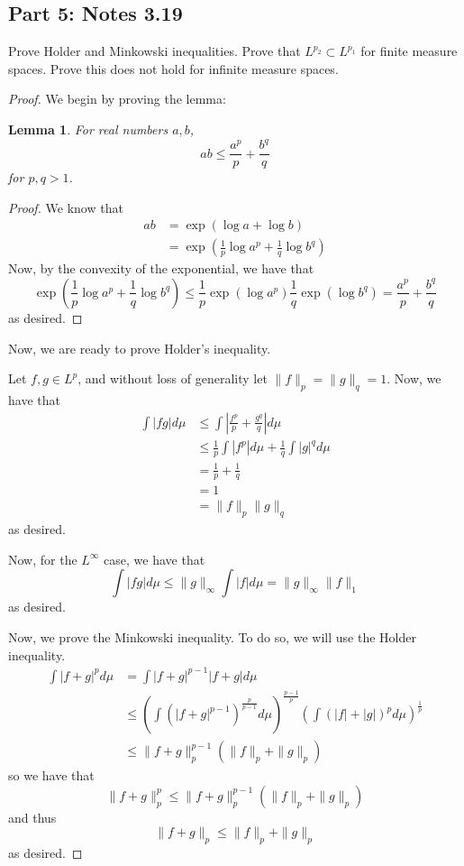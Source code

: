 \documentclass[fontsize=11pt]{scrartcl} %
\numberwithin{equation}{section} %
\numberwithin{figure}{section} %
\numberwithin{table}{section} %
\newtheorem{lemma}{Lemma}
\begin{document}
\subsection*{Part 5: Notes 3.19}
Prove Holder and Minkowski inequalities. Prove that $L^{p_2}\subset L^{p_1}$ for
finite measure spaces. Prove this does not hold for infinite measure spaces.
\\
\begin{proof}
We begin by proving the lemma:
\begin{lemma}
For real numbers $a,b$,
    \[
        ab \leq \frac{a^p}{p} + \frac{b^{q}}{q}
    \]
    for $p,q > 1$.
\end{lemma}
    \begin{proof}
    We know that
        \[
            \begin{aligned}
                ab &= \exp(\log a + \log b)\\
                    &=\exp\left(\frac{1}{p}\log a^p + \frac{1}{q}\log b^q\right)
            \end{aligned}
        \]
        Now, by the convexity of the exponential, we have that 
        \[
            \exp\left(\frac{1}{p}\log a^p + \frac{1}{q}\log b^q\right) \leq
            \frac{1}{p}\exp(\log a^p) \frac{1}{q}\exp(\log b^q)
            = \frac{a^p}{p} + \frac{b^q}{q}
        \]
        as desired.
    \end{proof}

    Now, we are ready to prove Holder's inequality.

    Let $f,g\in L^p$, and without loss of generality let $\|f\|_p = \|g\|_q =
    1$. Now, we have that 
    \[
    \begin{aligned}
        \int |fg|d\mu &\leq \int |\frac{f^p}{p}+\frac{g^q}{q}|d\mu\\
                    &\leq \frac{1}{p}\int |f^p|d\mu + \frac{1}{q}\int
                    |g|^qd\mu\\
                    &= \frac{1}{p} + \frac{1}{q}\\
                    &= 1\\
                    &= \|f\|_p \|g\|_q
    \end{aligned}
    \]
    as desired.

    Now, for the $L^{\infty}$ case, we have that
    \[
        \int |fg|d\mu \leq \|g\|_{\infty}\int |f|d\mu = \|g\|_{\infty}\|f\|_1
    \]
    as desired.

    Now, we prove the Minkowski inequality. To do so, we will use the Holder
    inequality.
    \[
        \begin{aligned}
            \int |f+g|^pd\mu &= \int |f+g|^{p-1}|f+g|d\mu\\
            &\leq (\int (|f+g|^{p-1})^{\frac{p}{p-1}}d\mu)^{\frac{p-1}{p}}(\int
            (|f|+|g|)^pd\mu)^{\frac{1}{p}}\\
            &\leq \|f+g\|_{p}^{p-1}(\|f\|_p+\|g\|_p)
        \end{aligned}
    \]
    so we have that
    \[
        \|f+g\|_p^p \leq \|f+g\|_p^{p-1}(\|f\|_p+\|g\|_p)
    \]
    and thus
    \[
        \|f+g\|_p \leq \|f\|_p + \|g\|_p
    \]
    as desired.


\end{proof}
\end{document}
